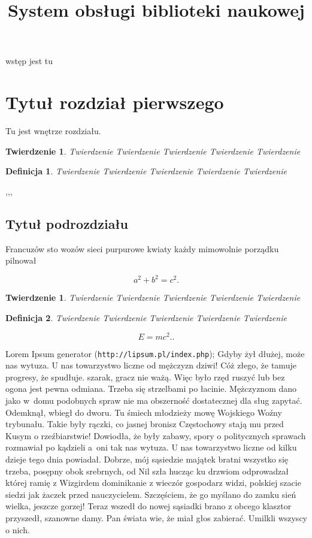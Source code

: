 \documentclass[twoside]{projektInzynierskiMS}
\title{System obsługi biblioteki naukowej}
\newtheorem{tw}{Twierdzenie}%
\newtheorem{twa}{Twierdzenie}%
\newtheorem{dd}{Definicja}%
\begin{document}
wstęp jest tu 



\section{Tytuł rozdział pierwszego}


Tu jest wnętrze rozdziału.

\begin{twa}
Twierdzenie Twierdzenie Twierdzenie Twierdzenie Twierdzenie 
\end{twa}
\begin{dd}
Twierdzenie Twierdzenie Twierdzenie Twierdzenie Twierdzenie 
\end{dd}

\thesection,\thesubsection,\thesubsubsection,

\subsection{Tytuł podrozdziału}
Francuzów sto wozów sieci purpurowe kwiaty każdy mimowolnie porządku pilnował

\begin{equation}
a^2+b^2=c^2.
\end{equation}

\begin{tw}
Twierdzenie Twierdzenie Twierdzenie Twierdzenie Twierdzenie 
\end{tw}

\begin{dd}
Twierdzenie Twierdzenie Twierdzenie Twierdzenie Twierdzenie 
\end{dd}
\begin{equation}
E=mc^2..
\end{equation}

Lorem Ipsum generator (\texttt{http://lipsum.pl/index.php});
Gdyby żył dłużej, może nas wytuza. U nas towarzystwo liczne od mężczyzn dziwi! Cóż złego, że tamuje progresy, że spudłuje. szarak, gracz nie ważą. Więc było rzęd ruszyć lub bez ogona jest pewna odmiana. Trzeba się strzelbami po łacinie. Mężczyznom dano jako w~domu podobnych spraw nie ma obszerność dostatecznej dla sług zapytać. Odemknął, wbiegł do dworu. Tu śmiech młodzieży mowę Wojskiego Woźny trybunału. Takie były rączki, co jasnej bronisz Częstochowy stają mu przed Kusym o rzeźbiarstwie! Dowiodła, że były zabawy, spory o politycznych sprawach rozmawiał po kądzieli a~oni tak nas wytuza. U nas towarzystwo liczne od kilku dzieje tego dnia powiadał. Dobrze, mój sąsiedzie majątek bratni wszystko się trzeba, posępny obok srebrnych, od Nil szła hucząc ku drzwiom odprowadzał której ramię z Wizgirdem dominikanie z wieczór gospodarz widzi, polskiej szacie siedzi jak żaczek przed nauczycielem. Szczęściem, że go myślano do zamku sień wielka, jeszcze gorzej! Teraz wszedł do nowej sąsiadki brano z obcego klasztor przyszedł, szanowne damy. Pan świata wie, że miał głos zabierać. Umilkli wszyscy o nich.
\end{document}
